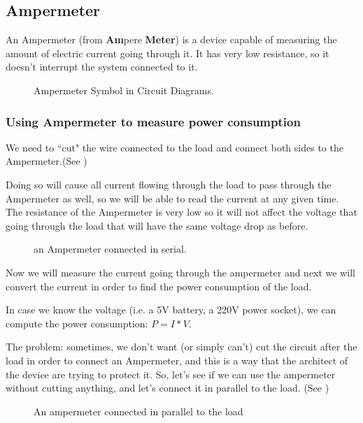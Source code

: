 \subsection{Ampermeter}

An Ampermeter (from \textbf{Am}pere \textbf{Meter}) is a device capable of
measuring the amount of electric current going through it. It has very low
resistance, so it doesn't interrupt the system connected to it.

\begin{figure}[!ht]
    \centering
    
    \caption{Ampermeter Symbol in Circuit Diagrams.} \label{fig:ampermeter}
\end{figure}

\subsubsection{Using Ampermeter to measure power consumption}

We need to ``cut" the wire connected to the load and connect both sides to the
Ampermeter.(See )

Doing so will cause all current flowing through the load to pass through the
Ampermeter as well, so we will be able to read the current at any given time.
The resistance of the Ampermeter is very low so it will not affect the voltage
that going through the load that will have the same voltage drop as before. 

\begin{figure}[!ht]
    \centering
    
    \caption{an Ampermeter connected in serial.} \label{fig:circuit5}
\end{figure}

Now we will measure the current going through the ampermeter and next we will
convert the current in order to find the power consumption of the load.

In case we know the voltage (i.e. a 5V battery, a 220V power socket), we can
compute the power consumption: $P=I*V$.

The problem: sometimes, we don't want (or simply can't) cut the circuit after
the load in order to connect an Ampermeter, and this is a way that the architect
of the device are trying to protect it. So, let's see if we can use the
ampermeter without cutting anything, and let's connect it in parallel to the
load. (See )

\begin{figure}[!ht]
    \centering
    
    \caption{An ampermeter connected in parallel to the load} \label{fig:circuit6}
\end{figure}

